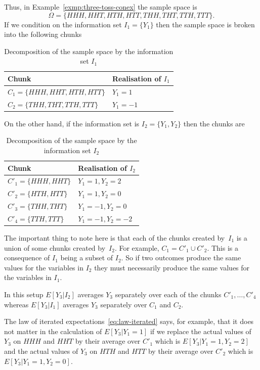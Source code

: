 \documentclass[11pt,reqno,openany]{amsbook}
\theoremstyle{plain}
\theoremstyle{definition}
\begin{document}
Thus, in Example~\ref{exmp:three-toss-conex} the sample space is
\[\Omega=\{HHH,HHT,HTH,HTT,THH,THT,TTH,TTT\}.\]
If we condition on the information set $I_1=\{Y_1\}$ then the sample
space is broken into the following chunks

\begin{table}[h]
\begin{tabular}{ll}
\hline
Chunk&Realisation of $I_1$\\
\hline
$C_1=\{HHH,HHT,HTH,HTT\}$&$Y_1=1$\\
$C_2=\{THH,THT,TTH,TTT\}$&$Y_1=-1$\\
\hline
\end{tabular}
\caption{Decomposition of the sample space by the information set $I_1$}\label{tab:decomp_I1}
\end{table}

On the other hand, if the information set is $I_2 = \{Y_1,Y_2\}$ then
the chunks are
\begin{table}[h]
\begin{tabular}{ll}
\hline
Chunk&Realisation of $I_2$\\
\hline
$C'_1=\{HHH,HHT\}$&$Y_1=1,Y_2=2$\\
$C'_2=\{HTH,HTT\}$&$Y_1=1,Y_2=0$\\
$C'_3=\{THH,THT\}$&$Y_1=-1,Y_2=0$\\
$C'_4=\{TTH,TTT\}$&$Y_1=-1,Y_2=-2$\\
\hline
\end{tabular}
\caption{Decomposition of the sample space by the information set $I_2$}\label{tab:decomp_I2}
\end{table}

The important thing to note here is that each of the chunks created
by~$I_1$ is a union of some chunks created by~$I_2$. For example,
$C_1=C'_1 \cup C'_2$. This is a consequence of $I_1$ being a subset of
$I_2$. So if two outcomes produce the same values for the variables in
$I_2$ they must necessarily produce the same values for the variables
in $I_1$.

In this setup $E[Y_3|I_2]$ averages $Y_3$ separately over each of the
chunks $C'_1,\ldots,C'_4$ whereas $E[Y_3|I_1]$ averages $Y_3$
separately over $C_1$ and $C_2$. 

The law of iterated expectations~\eqref{eq:law-iterated} says, for example, that it
does not matter in the calculation of $E[Y_3|Y_1=1]$ if we replace the
actual values of $Y_3$ on $HHH$ and $HHT$ by their average over $C'_1$
which is $E[Y_3|Y_1=1,Y_2=2]$ and the actual values of $Y_3$ on $HTH$ and
$HTT$ by their average over $C'_2$ which is $E[Y_3|Y_1=1,Y_2=0]$.
\end{document}
